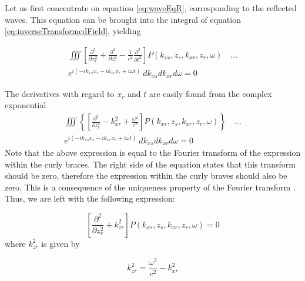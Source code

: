 \documentclass{article}%
\begin{document}
Let us first concentrate on equation \ref{eq:waveEqR}, corresponding to the reflected waves. This equation can be brought into the integral of equation \ref{eq:inverseTransformedField}, yielding

\begin{multline}
	\iiint \left[\frac{\partial^2}{\partial x_r^2} + \frac{\partial^2}{\partial z_r^2} - 
		\frac{1}{c^2} \frac{\partial^2}{\partial t^2} \right] 
		P(k_{xs},z_s,k_{xr},z_r,\omega) \quad \ldots \\
		e^{i\left(-ik_{xs}x_s -ik_{xr}x_r +i\omega t \right)} \ dk_{xs} dk_{xr} d\omega = 0
\end{multline}

The derivatives with regard to $x_r$ and $t$ are easily found from the complex exponential
\begin{multline}
	\iiint \left\{ \left[\frac{\partial^2}{\partial z_r^2} - k_{xr}^2 + \frac{\omega^2}{c^2} \right] 
		P(k_{xs},z_s,k_{xr},z_r,\omega) \right\} \quad \ldots \\
		e^{i\left(-ik_{xs}x_s -ik_{xr}x_r +i\omega t \right)} \ dk_{xs} dk_{xr} d\omega = 0
\label{eq:}
\end{multline}
Note that the above expression is equal to the Fourier transform of the expression within the curly braces. The right side of the equation states that this transform should be zero, therefore the expression within the curly braves should also be zero. This is a consequence of the uniqueness property of the Fourier transform \cite{Margrave2003}. Thus, we are left with the following expression:

\begin{equation}
	\left[\frac{\partial^2}{\partial z_r^2} + k_{zr}^2 \right] 
		P(k_{xs},z_s,k_{xr},z_r,\omega) = 0
\label{eq:Pzr}
\end{equation}
where $k_{zr}^2$ is given by

\begin{equation}
	 k_{zr}^2 = \frac{\omega^2}{c^2} - k_{xr}^2
\label{eq:kzr}
\end{equation}
\end{document}
